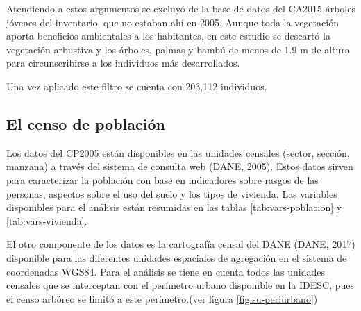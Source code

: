 \documentclass[12pt,a4paper,openany]{book}
\theoremstyle{definition}
\theoremstyle{definition}
\theoremstyle{definition}
\theoremstyle{remark}
\begin{document}
Atendiendo a estos argumentos se excluyó de la base de datos del CA2015
árboles jóvenes del inventario, que no estaban ahí en 2005. Aunque toda
la vegetación aporta beneficios ambientales a los habitantes, en este
estudio se descartó la vegetación arbustiva y los árboles, palmas y
bambú de menos de 1.9 m de altura para circunscribirse a los individuos
más desarrollados.

Una vez aplicado este filtro se cuenta con 203,112 individuos.

\subsection{El censo de población}\label{el-censo-de-poblaciuxf3n}

Los datos del CP2005 están disponibles en las unidades censales (sector,
sección, manzana) a través del sistema de consulta web (DANE,
\protect\hyperlink{ref-censo_sistema_dane}{2005}). Estos datos sirven
para caracterizar la población con base en indicadores sobre rasgos de
las personas, aspectos sobre el uso del suelo y los tipos de vivienda.
Las variables disponibles para el análisis están resumidas en las tablas
\ref{tab:vars-poblacion} y \ref{tab:vars-vivienda}.

El otro componente de los datos es la cartografía censal del DANE (DANE,
\protect\hyperlink{ref-geoportal_DANE}{2017}) disponible para las
diferentes unidades espaciales de agregación en el sistema de
coordenadas WGS84. Para el análisis se tiene en cuenta todos las
unidades censales que se interceptan con el perímetro urbano disponible
en la IDESC, pues el censo arbóreo se limitó a este perímetro.(ver
figura \ref{fig:su-periurbano})
\end{document}
